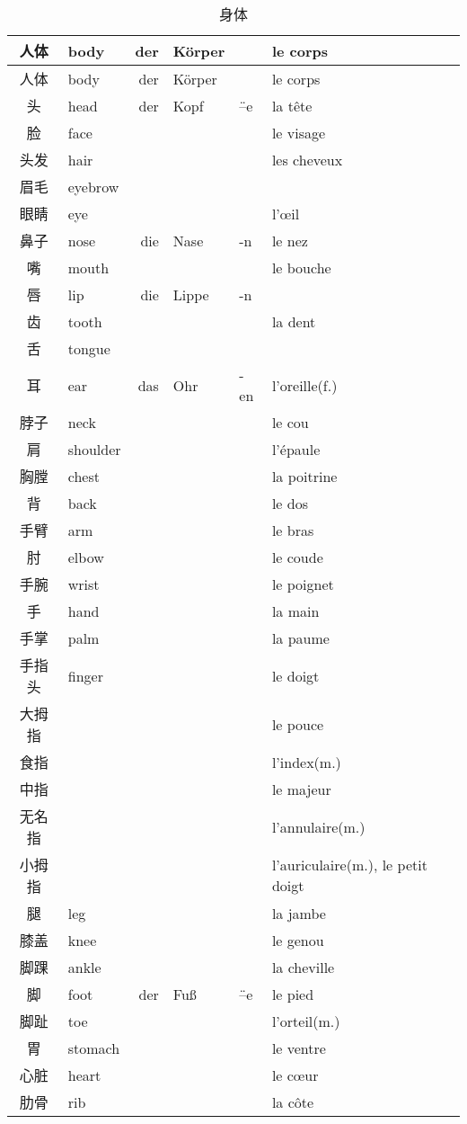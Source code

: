 \documentclass[12pt,A4paper,oneside,reqno]{amsart}
\numberwithin{equation}{section}
\theoremstyle{plain}
\theoremstyle{plain}
\theoremstyle{plain}
\numberwithin{equation}{section}
\theoremstyle{remark}
\begin{document}
\begin{longtable}{c|l|rll|l}
	\hline
	人体	&	body	&	der & K\"{o}rper&  &	le corps 	\\
	\hline
	\endhead
	\hline
	人体	&	body	&	der & K\"{o}rper&  &	le corps 	\\
	\hline
	\endfirsthead	
	\hline
	\endfoot
	\hline	
	\caption{身体}
	\endlastfoot				
头	&	head	&	der	&	Kopf	&	\"{--}e	&	la t\^{e}te	\\
脸	&	face	&		&		&		&	le visage	\\
头发	&	hair	&		&		&		&	les cheveux	\\
眉毛	&	eyebrow	&		&		&		&		\\
眼睛	&	eye	&		&		&		&	l'\oe il	\\
鼻子	&	nose	&	die	&	Nase	&	-n	&	le nez	\\
嘴	&	mouth	&		&		&		&	le bouche	\\
唇	&	lip	&	die	&	Lippe	&	-n	&		\\
齿	&	tooth	&		&		&		&	la dent	\\
舌	&	tongue	&		&		&		&		\\
耳	&	ear	&	das	&	Ohr	&	-en	&	l'oreille(f.)	\\
脖子	&	neck	&		&		&		&	le cou	\\
肩	&	shoulder	&		&		&		&	l'\'{e}paule	\\
胸膛	&	chest	&		&		&		&	la poitrine	\\
背	&	back	&		&		&		&	le dos	\\
手臂	&	arm	&		&		&		&	le bras	\\
肘	&	elbow	&		&		&		&	le coude	\\
手腕	&	wrist	&		&		&		&	le poignet	\\
手	&	hand	&		&		&		&	la main	\\
手掌	&	palm	&		&		&		&	la paume	\\
手指头	&	finger	&		&		&		&	le doigt	\\
大拇指	&		&		&		&		&	le pouce	\\
食指	&		&		&		&		&	l'index(m.)	\\
中指	&		&		&		&		&	le majeur	\\
无名指	&		&		&		&		&	l'annulaire(m.)	\\
小拇指	&		&		&		&		&	l'auriculaire(m.), le petit doigt	\\
腿	&	leg	&		&		&		&	la jambe	\\
膝盖	&	knee	&		&		&		&	le genou	\\
脚踝	&	ankle	&		&		&		&	la cheville	\\
脚	&	foot	&	der 	&	Fu\ss 	&	\"{--}e	&	le pied	\\
脚趾	&	toe	&		&		&		&	l'orteil(m.)	\\
胃	&	stomach	&		&		&		&	le ventre	\\
心脏	&	heart	&		&		&		&	le c\oe ur	\\
肋骨	&	rib	&		&		&		&	la c\^{o}te	\\



	
	
\end{longtable}
\end{document}
